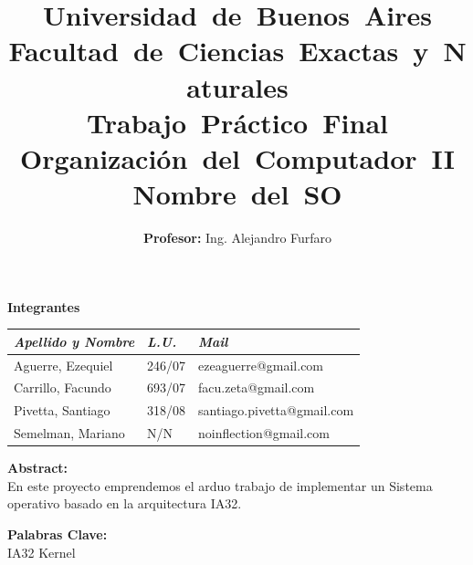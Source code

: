 \documentclass[a4paper,10pt]{article}
\begin{document}
 
\title{
	\mbox{\Huge Universidad de Buenos Aires}\\
	\mbox{\huge Facultad de Ciencias Exactas y Naturales}\\
	\vspace{20mm}
	\mbox{\textbf{Trabajo Pr\'actico Final}}\\
	\mbox{\textbf{Organización del Computador II}}\\
	\mbox{\textbf{Nombre del SO}}\\
	\vspace{8mm}
}
\author{\Large\textbf{Profesor:} Ing. Alejandro Furfaro}
\date{}
\maketitle \thispagestyle{empty}

\begin{center}
    \vspace{15mm}
    \textbf{Integrantes}\\

    \begin{tabular}{|l|l|l|}
        \hline
        \textit{Apellido y Nombre} & \textit{L.U.} & \textit{Mail} \\
        \hline
		Aguerre, Ezequiel & 246/07 & ezeaguerre@gmail.com \\
        \hline
		Carrillo, Facundo & 693/07 & facu.zeta@gmail.com \\
	    \hline
		Pivetta, Santiago & 318/08 & santiago.pivetta@gmail.com \\
        \hline
		Semelman, Mariano & N/N & noinflection@gmail.com \\
        \hline
    \end{tabular}
\end{center}


\begin{center}
    \vspace{10mm}
    \textbf{Abstract:}\\    
   En este proyecto emprendemos el arduo trabajo de implementar un Sistema operativo basado en la arquitectura IA32.
    \vspace{5mm}
\end{center}

\begin{center}
    \vspace{5mm}
    \textbf{Palabras Clave:}\\
		IA32 Kernel
    \vspace{5mm}
\end{center}
\end{document}
